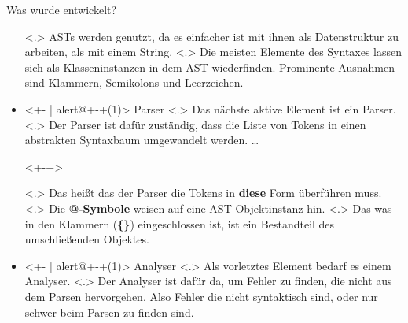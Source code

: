 \begin{frame}{Was wurde entwickelt?}
\begin{itemize}[<+- | alert@+>]
{            }
            \note[item]<.>{
              ASTs werden genutzt, da es einfacher ist mit ihnen als Datenstruktur zu arbeiten, als mit einem String.
            }
            \note[item]<.>{
              Die meisten Elemente des Syntaxes lassen sich als Klasseninstanzen in dem AST wiederfinden. Prominente Ausnahmen sind Klammern, Semikolons und Leerzeichen.
            }
      \item<+- | alert@+-+(1)>
        Parser%
            \note[item]<.>{
              Das nächste aktive Element ist ein Parser.
            }
            \note[item]<.>{
              Der Parser ist dafür zuständig, dass die Liste von Tokens in einen abstrakten Syntaxbaum umgewandelt werden.
              \ldots
            }
        \begin{uncoverenv}<+-+>%
        \end{uncoverenv}%
            \note[item]<.>{
              Das heißt das der Parser die Tokens in \textbf{diese} Form überführen muss.
            }%
            \note[item]<.>{
              Die \textbf{@-Symbole} weisen auf eine AST Objektinstanz hin.
            }%
            \note[item]<.>{
              Das was in den Klammern (\textbf{\{\}}) eingeschlossen ist, ist ein Bestandteil des umschließenden Objektes.
            }%
      \item<+- | alert@+-+(1)>
        Analyser%
            \note[item]<.>{
              Als vorletztes Element bedarf es einem Analyser.
            }
            \note[item]<.>{
              Der Analyser ist dafür da, um Fehler zu finden, die nicht aus dem Parsen hervorgehen. Also Fehler die nicht syntaktisch sind, oder nur schwer beim Parsen zu finden sind.
}
\end{itemize}
\end{frame}
